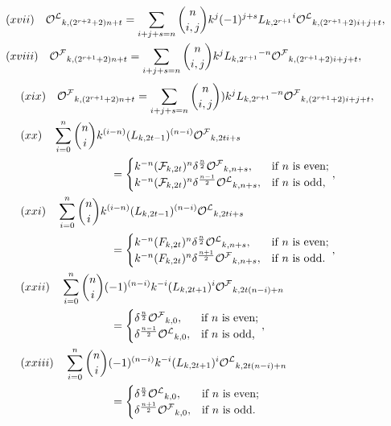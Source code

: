 \begin{theorem}
\begin{align*}
&(xvii)\quad{{\mathcal{O^L}}}_{k,(2^{r+2}+2)n+t}=\sum\limits_{i+j+s=n}\binom{n}{i, j} k^{j}(-1)^{j+s}{{L}_{k,2^{r+1}}}^i{{\mathcal{O^L}}}_{k,(2^{r+1}+2)i+j+t},\\
&(xviii)\quad{{\mathcal{O^F}}}_{k,(2^{r+1}+2)n+t}=\sum\limits_{i+j+s=n}\binom{n}{i, j} k^{j}{{L}_{k,2^{r+1}}}^{-n}{{\mathcal{O^F}}}_{k,(2^{r+1}+2)i+j+t},\\
\end{align*}
\begin{align*}
&(xix)\quad{{\mathcal{O^F}}}_{k,(2^{r+1}+2)n+t}=\sum\limits_{i+j+s=n}\binom{n}{i, j}) k^{j}{{L}_{k,2^{r+1}}}^{-n}{{\mathcal{O^F}}}_{k,(2^{r+1}+2)i+j+t},\\
&(xx)\quad\sum\limits_{i=0}^{n}\binom{n}{i}k^{(i-n)}({L}_{k,2t-1})^{(n-i)}{{\mathcal{O^F}}}_{k,2ti+s}\\
&\qquad\qquad\qquad\qquad=\begin{cases} 
k^{-n}(\mathcal{F}_{k,2t})^n\delta^{\frac{n}{2}}{{\mathcal{O^F}}}_{k,n+s},& \text{if $n$ is even;}\\
k^{-n}(\mathcal{F}_{k,2t})^n\delta^{\frac{n-1}{2}}{{\mathcal{O^L}}}_{k,n+s},& \text{if $n$ is odd,}\end{cases}, \\
&(xxi)\quad\sum\limits_{i=0}^{n}\binom{n}{i}k^{(i-n)}({L}_{k,2t-1})^{(n-i)}{{\mathcal{O^L}}}_{k,2ti+s}\\
&\qquad\qquad\qquad\qquad=\begin{cases} 
k^{-n}({F}_{k,2t})^n\delta^{\frac{n}{2}}{{\mathcal{O^L}}}_{k,n+s},& \text{if $n$ is even;}\\
k^{-n}({F}_{k,2t})^n\delta^{\frac{n+1}{2}}{{\mathcal{O^F}}}_{k,n+s},& \text{if $n$ is odd.}
\end{cases}, \\
&(xxii)\quad\sum\limits_{i=0}^{n}\binom{n}{i}(-1)^{(n-i)}k^{-i}(L_{k,2t+1})^i{{\mathcal{O^F}}}_{k,2t(n-i)+n}\\
&\qquad\qquad\qquad\qquad=\begin{cases} 
{\delta}^{\frac{n}{2}}{{\mathcal{O^F}}}_{k,0},& \text{if $n$ is even;}\\
{\delta}^{\frac{n-1}{2}}{{\mathcal{O^L}}}_{k,0},& \text{if $n$ is odd,}
\end{cases},\\
&(xxiii)\quad\sum\limits_{i=0}^{n}\binom{n}{i}(-1)^{(n-i)}k^{-i}(L_{k,2t+1})^i{{\mathcal{O^L}}}_{k,2t(n-i)+n}\\\
&\qquad\qquad\qquad\qquad=\begin{cases} 
{\delta}^{\frac{n}{2}}{{\mathcal{O^L}}}_{k,0},& \text{if $n$ is even;}\\
{\delta}^{\frac{n+1}{2}}{{\mathcal{O^F}}}_{k,0},& \text{if $n$ is odd.}
\end{cases} 
\end{align*}
\end{theorem}

